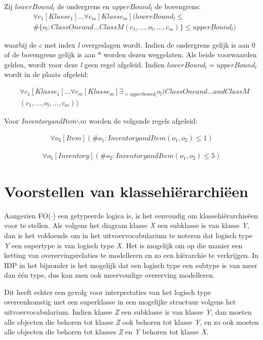Zij $lowerBound_l$ de ondergrens en $upperBound_l$ de bovengrens:
\begin{align*}
	&\forall{c_1}[Klasse_1]\ldots\forall{c_m}[Klasse_m](lowerBound_l \leq
	\\
	&\#\{o_l: ClassOneand\ldots{}ClassM(c_1,\ldots,o_l,\ldots,c_m)\} \leq upperBound_l)
\end{align*}
	
waarbij de \textit{c} met index \textit{l} overgeslagen wordt. Indien de ondergrens gelijk is aan $0$ of de bovengrens gelijk is aan $*$ worden dezen weggelaten. Als beide voorwaarden gelden, wordt voor deze \textit{l} geen regel afgeleid. Indien $lowerBound_l = upperBound_l$ wordt in de plaats afgeleid:
	
	\begin{align*}
	&\forall{c_1}[Klasse_1]\ldots\forall{c_m}[Klasse_m] \exists_{=upperbound_l}o_l(ClassOneand\ldots{}andClassM\\&(c_1,\ldots,o_l,\ldots,c_m))
	\end{align*}
	
	Voor \textit{InventoryandItem$\backslash{}m$} worden de volgende regels afgeleid:
	
\begin{align*}
		\forall{o_2}[Item](\#{o_1: InventoryandItem(o_1,o_2)} \leq 1)
\end{align*} 
		
\begin{align*}
		\forall{o_1}[Inventory](\#{o_2: InventoryandItem(o_1,o_2)} \leq 5)
\end{align*}

\section{Voorstellen van klassehi\"erarchi\"een}\label{sec:hierarchies}
Aangezien FO($\cdot$) een getypeerde logica is, is het eenvoudig om klassehi\"erarchie\"een voor te stellen. Als volgens het diagram klasse \textit{X} een subklasse is van klasse \textit{Y}, dan is het voldoende om in het uitvoervocabularium te noteren dat logisch type \textit{Y} een supertype is van logisch type \textit{X}. Het is mogelijk om op die manier een ketting van overervingsrelaties te modelleren en zo een hi\"erarchie te verkrijgen. In IDP in het bijzonder is het mogelijk dat een logisch type een subtype is van meer dan \'e\'en type, dus kan men ook meervoudige overerving modelleren.

Dit heeft echter een gevolg voor interpretaties van het logisch type overeenkomstig met een superklasse in een mogelijke structuur volgens het uitvoervocabularium. Indien klasse \textit{Z} een subklasse is van klasse \textit{Y}, dan moeten alle objecten die behoren tot klasse \textit{Z} ook behoren tot klasse \textit{Y}, en zo ook moeten alle objecten die behoren tot klasses \textit{Z} en \textit{Y} behoren tot klasse \textit{X}.

